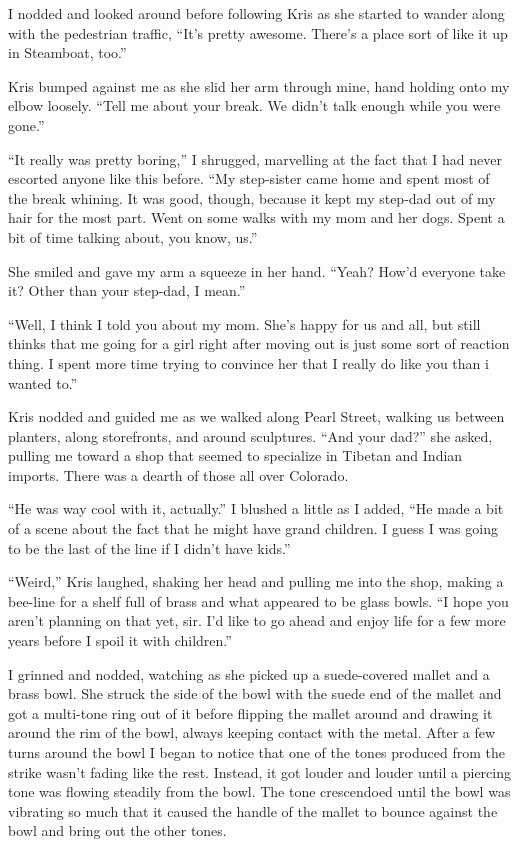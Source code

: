 I nodded and looked around before following Kris as she started to wander along with the pedestrian traffic, ``It's pretty awesome.  There's a place sort of like it up in Steamboat, too.''

Kris bumped against me as she slid her arm through mine, hand holding onto my elbow loosely.  ``Tell me about your break.  We didn't talk enough while you were gone.''

``It really was pretty boring,'' I shrugged, marvelling at the fact that I had never escorted anyone like this before.  ``My step-sister came home and spent most of the break whining.  It was good, though, because it kept my step-dad out of my hair for the most part.  Went on some walks with my mom and her dogs.  Spent a bit of time talking about, you know, us.''

She smiled and gave my arm a squeeze in her hand.  ``Yeah?  How'd everyone take it?  Other than your step-dad, I mean.''

``Well, I think I told you about my mom.  She's happy for us and all, but still thinks that me going for a girl right after moving out is just some sort of reaction thing.  I spent more time trying to convince her that I really do like you than i wanted to.''

Kris nodded and guided me as we walked along Pearl Street, walking us between planters, along storefronts, and around sculptures.  ``And your dad?'' she asked, pulling me toward a shop that seemed to specialize in Tibetan and Indian imports.  There was a dearth of those all over Colorado.

``He was way cool with it, actually.''  I blushed a little as I added, ``He made a bit of a scene about the fact that he might have grand children.  I guess I was going to be the last of the line if I didn't have kids.''

``Weird,'' Kris laughed, shaking her head and pulling me into the shop, making a bee-line for a shelf full of brass and what appeared to be glass bowls.  ``I hope you aren't planning on that yet, sir.  I'd like to go ahead and enjoy life for a few more years before I spoil it with children.''

I grinned and nodded, watching as she picked up a suede-covered mallet and a brass bowl.  She struck the side of the bowl with the suede end of the mallet and got a multi-tone ring out of it before flipping the mallet around and drawing it around the rim of the bowl, always keeping contact with the metal.  After a few turns around the bowl I began to notice that one of the tones produced from the strike wasn't fading like the rest.  Instead, it got louder and louder until a piercing tone was flowing steadily from the bowl.  The tone crescendoed until the bowl was vibrating so much that it caused the handle of the mallet to bounce against the bowl and bring out the other tones.

